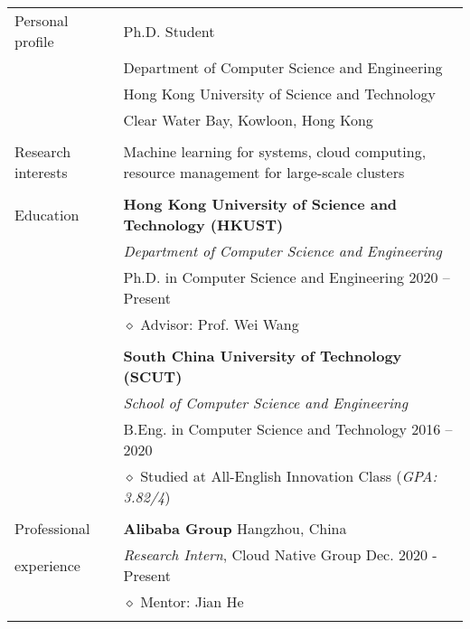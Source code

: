 \documentclass[letterpaper, 11pt]{article}
\begin{document}
\begin{longtable}{p{1.3in}p{4.8in}}

{Personal profile}
& Ph.D. Student \\
& Department of Computer Science and Engineering \\
& Hong Kong University of Science and Technology \\
& Clear Water Bay, Kowloon, Hong Kong \\
& \\

\nohyphens{Research interests}
& Machine learning for systems, cloud computing, resource management for large-scale clusters \\
& \\

{Education}
& \textbf{Hong Kong University of Science and Technology (HKUST)} \\
& \textit{Department of Computer Science and Engineering} \\
& Ph.D. in Computer Science and Engineering \hfill 2020 -- Present \\
& $\diamond$ Advisor: Prof. Wei Wang \\
& \\

& \textbf{South China University of Technology (SCUT)} \\
& \textit{School of Computer Science and Engineering} \\
& B.Eng. in Computer Science and Technology \hfill 2016 -- 2020 \\
& $\diamond$ Studied at All-English Innovation Class ({\it GPA: 3.82/4}) \\
& \\


{Professional}
& {\textbf{Alibaba Group}} \hfill Hangzhou, China \\
{experience}
& \textit{Research Intern}, Cloud Native Group \hfill Dec. 2020 - Present \\
& $\diamond$ Mentor: Jian He \\
& \\


\end{longtable}
\end{document}
